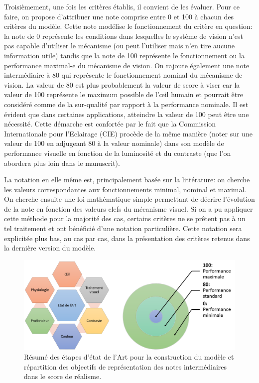	\par Troisièmement, une fois les critères établis, il convient de les évaluer. Pour ce faire, on propose d'attribuer une note comprise entre 0 et 100 à chacun des critères du modèle. Cette note modélise le fonctionnement du critère en question: la note de 0 représente les conditions dans lesquelles le système de vision n'est pas capable d'utiliser le mécanisme (ou peut l'utiliser mais n'en tire aucune information utile) tandis que la note de 100 représente le fonctionnement ou la performance maximal-e du mécanisme de vision. On rajoute également une note intermédiaire à 80 qui représente le fonctionnement nominal du mécanisme de vision. La valeur de 80 est plus probablement la valeur de score à viser car la valeur de 100 représente le maximum possible de l'œil humain et pourrait être considéré comme de la sur-qualité par rapport à la performance nominale. Il est évident que dans certaines applications, atteindre la valeur de 100 peut être une nécessité. Cette démarche est confortée par le fait que la Commission Internationale pour l'Eclairage (CIE) procède de la même manière (noter sur une valeur de 100 en adjugeant 80 à la valeur nominale) dans son modèle de performance visuelle en fonction de la luminosité et du contraste (que l'on abordera plus loin dans le manuscrit).
	
	\par La notation en elle même est, principalement basée sur la littérature: on cherche les valeurs correspondantes aux fonctionnements minimal, nominal et maximal. On cherche ensuite une loi mathématique simple permettant de décrire l'évolution de la note en fonction des valeurs clefs du mécanisme visuel. Si on a pu appliquer cette méthode pour la majorité des cas, certains critères ne se prêtent pas à un tel traitement et ont bénéficié d'une notation particulière. Cette notation sera explicitée plus bas, au cas par cas, dans la présentation des critères retenus dans la dernière version du modèle.
	
	\begin{figure}
		\centering
		\includegraphics[scale=.50]{Figures/EDLAProcessScoreTarget}
		\caption{Résumé des étapes d'état de l'Art pour la construction du modèle et répartition des objectifs de représentation des notes intermédiaires dans le score de réalisme.}
		\label{fig:edla_process_score_target}
	\end{figure}
	
